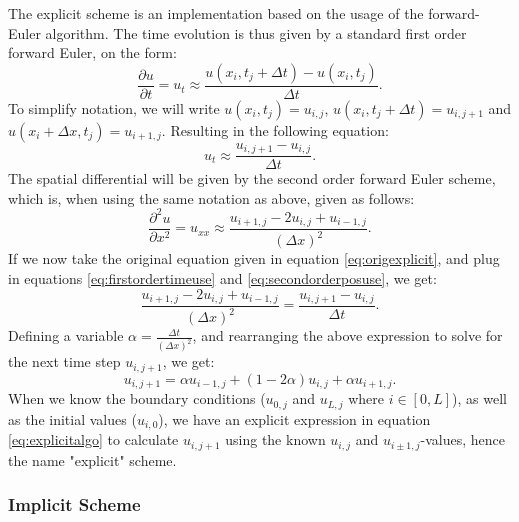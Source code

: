 \documentclass[reprint,english,notitlepage]{revtex4-1}  %
\begin{document}
The explicit scheme is an implementation based on the usage of the forward-Euler algorithm. The time evolution is thus given by a standard first order forward Euler, on the form:
\begin{equation}\label{eq:firstordertime}
    \frac{\partial u}{\partial t} = u_t \approx \frac{u(x_i,t_j+\Delta t)-u(x_i,t_j)}{\Delta t}.
\end{equation}
To simplify notation, we will write $u(x_i,t_j) = u_{i,j}$, $u(x_i,t_j+\Delta t) = u_{i,j+1}$ and $u(x_i + \Delta x,t_j) = u_{i+1,j}$. Resulting in the following equation:
\begin{equation}\label{eq:firstordertimeuse}
    u_t \approx \frac{u_{i,j+1} - u_{i,j}}{\Delta t}.
\end{equation}
The spatial differential will be given by the second order forward Euler scheme, which is, when using the same notation as above, given as follows:
\begin{equation}\label{eq:secondorderposuse}
    \frac{\partial^2 u}{\partial x^2} = u_{xx} \approx \frac{u_{i+1,j} - 2u_{i,j} + u_{i-1,j}}{(\Delta x)^2}.
\end{equation}
If we now take the original equation given in equation \ref{eq:origexplicit}, and plug in equations \ref{eq:firstordertimeuse} and \ref{eq:secondorderposuse}, we get:
\begin{equation}
    \frac{u_{i+1,j} - 2u_{i,j} + u_{i-1,j}}{(\Delta x)^2} = \frac{u_{i,j+1} - u_{i,j}}{\Delta t}.
\end{equation}
Defining a variable $\alpha = \frac{\Delta t}{(\Delta x)^2}$, and rearranging the above expression to solve for the next time step $u_{i,j+1}$, we get:
\begin{equation}\label{eq:explicitalgo}
    u_{i,j+1} = \alpha u_{i-1,j} + (1-2\alpha)u_{i,j} + \alpha u_{i+1,j}.
\end{equation}
When we know the boundary conditions ($u_{0,j}$ and $u_{L,j}$ where $i \in [0,L]$), as well as the initial values ($u_{i,0}$), we have an explicit expression in equation \ref{eq:explicitalgo} to calculate $u_{i,j+1}$ using the known $u_{i,j}$ and $u_{i\pm1,j}$-values, hence the name "explicit" scheme.

\subsubsection{Implicit Scheme}
\end{document}

